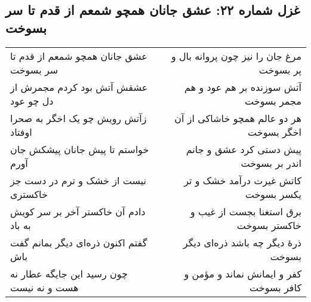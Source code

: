 \begin{center}
\section*{غزل شماره ۲۲: عشق جانان همچو شمعم از قدم تا سر بسوخت}
\label{sec:022}
\begin{longtable}{l p{0.5cm} r}
عشق جانان همچو شمعم از قدم تا سر بسوخت
&&
مرغ جان را نیز چون پروانه بال و پر بسوخت
\\
عشقش آتش بود کردم مجمرش از دل چو عود
&&
آتش سوزنده بر هم عود و هم مجمر بسوخت
\\
زآتش رویش چو یک اخگر به صحرا اوفتاد
&&
هر دو عالم همچو خاشاکی از آن اخگر بسوخت
\\
خواستم تا پیش جانان پیشکش جان آورم
&&
پیش دستی کرد عشق و جانم اندر بر بسوخت
\\
نیست از خشک و ترم در دست جز خاکستری
&&
کاتش غیرت درآمد خشک و تر یکسر بسوخت
\\
دادم آن خاکستر آخر بر سر کویش به باد
&&
برق استغنا بجست از غیب و خاکستر بسوخت
\\
گفتم اکنون ذره‌ای دیگر بمانم گفت باش
&&
ذرهٔ دیگر چه باشد ذره‌ای دیگر بسوخت
\\
چون رسید این جایگه عطار نه هست و نه نیست
&&
کفر و ایمانش نماند و مؤمن و کافر بسوخت
\\
\end{longtable}
\end{center}

